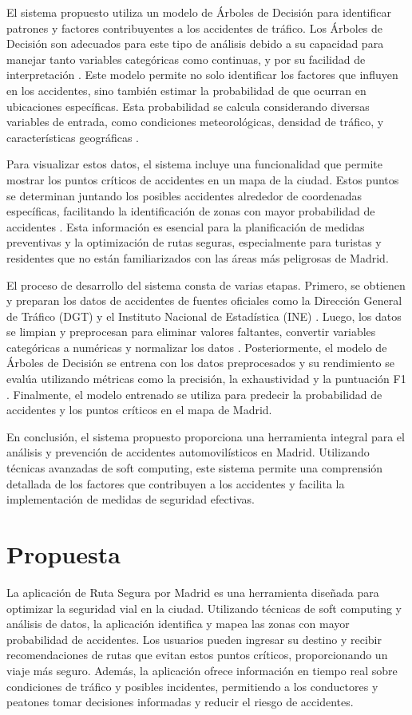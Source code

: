 El sistema propuesto utiliza un modelo de Árboles de Decisión para identificar patrones y factores contribuyentes a los accidentes de tráfico. Los Árboles de Decisión son adecuados para este tipo de análisis debido a su capacidad para manejar tanto variables categóricas como continuas, y por su facilidad de interpretación . Este modelo permite no solo identificar los factores que influyen en los accidentes, sino también estimar la probabilidad de que ocurran en ubicaciones específicas. Esta probabilidad se calcula considerando diversas variables de entrada, como condiciones meteorológicas, densidad de tráfico, y características geográficas .

Para visualizar estos datos, el sistema incluye una funcionalidad que permite mostrar los puntos críticos de accidentes en un mapa de la ciudad. Estos puntos se determinan juntando los posibles accidentes alrededor de coordenadas específicas, facilitando la identificación de zonas con mayor probabilidad de accidentes \cite{fayyad1996data}. Esta información es esencial para la planificación de medidas preventivas y la optimización de rutas seguras, especialmente para turistas y residentes que no están familiarizados con las áreas más peligrosas de Madrid.

El proceso de desarrollo del sistema consta de varias etapas. Primero, se obtienen y preparan los datos de accidentes de fuentes oficiales como la Dirección General de Tráfico (DGT) y el Instituto Nacional de Estadística (INE) \cite{dgt}. Luego, los datos se limpian y preprocesan para eliminar valores faltantes, convertir variables categóricas a numéricas y normalizar los datos \cite{han2011data}. Posteriormente, el modelo de Árboles de Decisión se entrena con los datos preprocesados y su rendimiento se evalúa utilizando métricas como la precisión, la exhaustividad y la puntuación F1 \cite{powers2020evaluation}. Finalmente, el modelo entrenado se utiliza para predecir la probabilidad de accidentes y los puntos críticos en el mapa de Madrid.

En conclusión, el sistema propuesto proporciona una herramienta integral para el análisis y prevención de accidentes automovilísticos en Madrid. Utilizando técnicas avanzadas de soft computing, este sistema permite una comprensión detallada de los factores que contribuyen a los accidentes y facilita la implementación de medidas de seguridad efectivas.
\section{Propuesta}
La aplicación de Ruta Segura por Madrid es una herramienta diseñada para optimizar la seguridad vial en la ciudad. Utilizando técnicas de soft computing y análisis de datos, la aplicación identifica y mapea las zonas con mayor probabilidad de accidentes. Los usuarios pueden ingresar su destino y recibir recomendaciones de rutas que evitan estos puntos críticos, proporcionando un viaje más seguro. Además, la aplicación ofrece información en tiempo real sobre condiciones de tráfico y posibles incidentes, permitiendo a los conductores y peatones tomar decisiones informadas y reducir el riesgo de accidentes.

